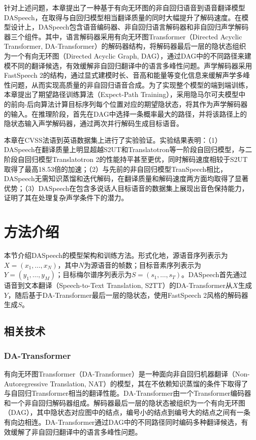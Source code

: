 针对上述问题，本章提出了一种基于有向无环图的非自回归语音到语音翻译模型DASpeech，在取得与自回归模型相当翻译质量的同时大幅提升了解码速度。在模型设计上，DASpeech包含语音编码器、非自回归语言解码器和非自回归声学解码器三个组件。其中，语言解码器采用有向无环图Transformer（Directed Acyclic Transformer, DA-Transformer）\citep{huang2022DATransformer}的解码器结构，将解码器最后一层的隐状态组织为一个有向无环图（Directed Acyclic Graph, DAG），通过DAG中的不同路径来建模不同的翻译候选，有效缓解非自回归翻译中的语言多峰性问题。声学解码器采用FastSpeech 2\citep{ren2021fastspeech2}的结构，通过显式建模时长、音高和能量等变化信息来缓解声学多峰性问题，从而实现高质量的非自回归语音合成。为了实现整个模型的端到端训练，本章提出了期望路径训练算法（Expect-Path Training），采用隐马尔可夫模型中的前向-后向算法计算目标序列每个位置对应的期望隐状态，将其作为声学解码器的输入。在推理阶段，首先在DAG中选择一条概率最大的路径，并将该路径上的隐状态输入声学解码器，通过两次并行解码生成目标语音。

本章在CVSS法语到英语数据集上进行了实验验证。实验结果表明：（1）DASpeech在翻译质量上明显超越S2UT和Translatotron等一阶段自回归模型，与二阶段自回归模型Translatotron 2的性能持平甚至更优，同时解码速度相较于S2UT取得了最高18.53倍的加速；（2）与先前的非自回归模型TranSpeech相比，DASpeech无需知识蒸馏和迭代解码，在翻译质量和解码速度两方面均取得了显著优势；（3）DASpeech在包含多说话人目标语音的数据集上展现出音色保持能力，证明了其在处理复杂声学条件下的潜力。


\section{方法介绍}

本节介绍DASpeech的模型架构和训练方法。形式化地，源语音序列表示为$X=(x_1, \ldots, x_N)$，其中$N$为源语音的帧数；目标音素序列表示为$Y=(y_1, \ldots, y_M)$；目标梅尔谱序列表示为$S=(s_1, \ldots, s_T)$。DASpeech首先通过语音到文本翻译（Speech-to-Text Translation, S2TT）的DA-Transformer从$X$生成$Y$，随后基于DA-Transformer最后一层的隐状态，使用FastSpeech 2风格的解码器生成$S$。

\subsection{相关技术}

\subsubsection{DA-Transformer}

有向无环图Transformer（DA-Transformer）\citep{huang2022DATransformer, huang2022PDAT}是一种面向非自回归机器翻译（Non-Autoregressive Translation, NAT）的模型，其在不依赖知识蒸馏的条件下取得了与自回归Transformer\citep{transformer}相当的翻译性能。DA-Transformer由一个Transformer编码器和一个非自回归解码器组成。解码器最后一层的隐状态被组织为一个有向无环图（DAG），其中隐状态对应图中的结点，编号小的结点到编号大的结点之间有一条有向边相连。DA-Transformer通过DAG中的不同路径同时编码多种翻译候选，有效缓解了非自回归翻译中的语言多峰性问题。


